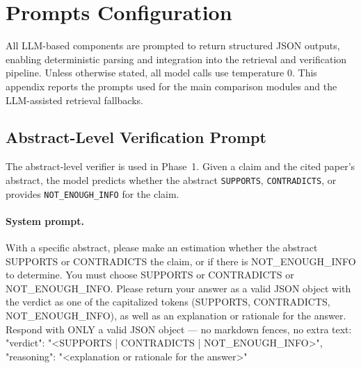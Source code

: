 \documentclass{article}
\theoremstyle{plain}
\theoremstyle{definition}
\theoremstyle{remark}
\begin{document}



\section{Prompts Configuration}
\label{app:prompts}

All LLM-based components are prompted to return structured JSON outputs, enabling deterministic parsing and integration into the retrieval and verification pipeline. Unless otherwise stated, all model calls use temperature $0$. This appendix reports the prompts used for the main comparison modules and the LLM-assisted retrieval fallbacks.

\subsection{Abstract-Level Verification Prompt}
\label{app:abstract_prompt}

The abstract-level verifier is used in Phase~1. Given a claim and the cited paper's abstract, the model predicts whether the abstract \texttt{SUPPORTS}, \texttt{CONTRADICTS}, or provides \texttt{NOT\_ENOUGH\_INFO} for the claim.

\paragraph{System prompt.}
\begin{promptbox}
With a specific abstract, please make an estimation whether the abstract SUPPORTS or CONTRADICTS the claim, or if there is NOT_ENOUGH_INFO to determine.
You must choose SUPPORTS or CONTRADICTS or NOT_ENOUGH_INFO.
Please return your answer as a valid JSON object with the verdict as one of the capitalized tokens (SUPPORTS, CONTRADICTS, NOT_ENOUGH_INFO), as well as an explanation or rationale for the answer.
Respond with ONLY a valid JSON object — no markdown fences, no extra text:
{
  "verdict": "<SUPPORTS | CONTRADICTS | NOT_ENOUGH_INFO>",
  "reasoning": "<explanation or rationale for the answer>"
}
\end{promptbox}
\end{document}
